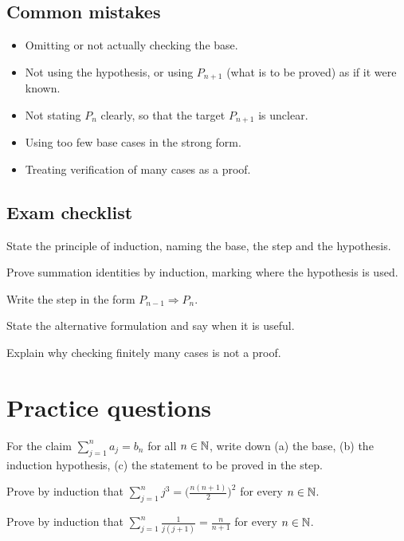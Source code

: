 \subsection*{Common mistakes}
\begin{itemize}
  \item Omitting or not actually checking the base.
  \item Not using the hypothesis, or using $P_{n+1}$ (what is to be proved) as if it were known.
  \item Not stating $P_n$ clearly, so that the target $P_{n+1}$ is unclear.
  \item Using too few base cases in the strong form.
  \item Treating verification of many cases as a proof.
\end{itemize}

\subsection*{Exam checklist}
\begin{checklist}
  \item State the principle of induction, naming the base, the step and the hypothesis.
  \item Prove summation identities by induction, marking where the hypothesis is used.
  \item Write the step in the form $P_{n-1}\Rightarrow P_n$.
  \item State the alternative formulation and say when it is useful.
  \item Explain why checking finitely many cases is not a proof.
\end{checklist}

\section{Practice questions}
\pq[basic] For the claim $\sum_{j=1}^{n}a_j=b_n$ for all $n\in\mathbb{N}$, write down (a) the base, (b) the induction hypothesis,
(c) the statement to be proved in the step.

\pq[mathematical] Prove by induction that $\sum_{j=1}^{n}j^3=\Big(\frac{n(n+1)}2\Big)^2$ for every $n\in\mathbb{N}$.

\pq[mathematical] Prove by induction that $\sum_{j=1}^{n}\frac{1}{j(j+1)}=\frac{n}{n+1}$ for every $n\in\mathbb{N}$.

